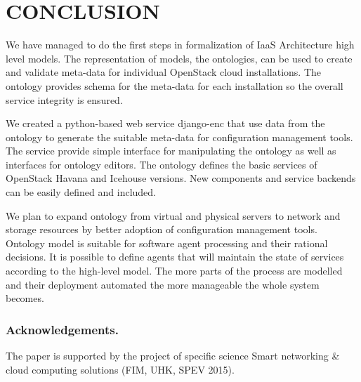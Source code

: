 
\section{CONCLUSION}

We have managed to do the first steps in formalization of IaaS Architecture high level models. The representation of models, the ontologies, can be used to create and validate meta-data for individual OpenStack cloud installations. The ontology provides schema for the meta-data for each installation so the overall service integrity is ensured.

We created a python-based web service django-enc that use data from the ontology to generate the suitable meta-data for configuration management tools. The service provide simple interface for manipulating the ontology as well as interfaces for ontology editors. The ontology defines the basic services of OpenStack Havana and Icehouse versions. New components and service backends can be easily defined and included.



We plan to expand  ontology from virtual and physical servers to network and storage resources by better adoption of configuration management tools. Ontology model is suitable for software agent processing and their rational decisions. It is possible to define agents that will maintain the state of services according to the high-level model. The more parts of the process are modelled and their deployment automated the more manageable the whole system becomes.

\subsubsection*{Acknowledgements.}
 
The paper is supported by the project of specific science Smart networking \& cloud computing solutions (FIM, UHK, SPEV 2015).

